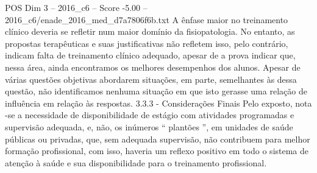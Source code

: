 \begin{textsample}{POS Dim 3 – 2016\_c6 – Score -5.00 – 2016\_c6/enade\_2016\_med\_d7a7806f6b.txt}
A ênfase maior no treinamento clínico deveria se refletir num maior domínio da fisiopatologia.
No entanto, as propostas terapêuticas e suas justificativas não refletem isso, pelo contrário, indicam falta de treinamento clínico adequado, apesar de a prova indicar que, nessa área, ainda encontramos os melhores desempenhos dos alunos.
Apesar de várias questões objetivas abordarem situações, em parte, semelhantes às dessa questão, não identificamos nenhuma situação em que isto gerasse uma relação de influência em relação às respostas. 3.3.3 - Considerações Finais Pelo exposto, nota -se a necessidade de disponibilidade de estágio com atividades programadas e supervisão adequada, e, não, os inúmeros “ plantões ”, em unidades de saúde públicas ou privadas, que, sem adequada supervisão, não contribuem para melhor formação profissional, com isso, haveria um reflexo positivo em todo o sistema de atenção à saúde e sua disponibilidade para o treinamento profissional.

\end{textsample}
